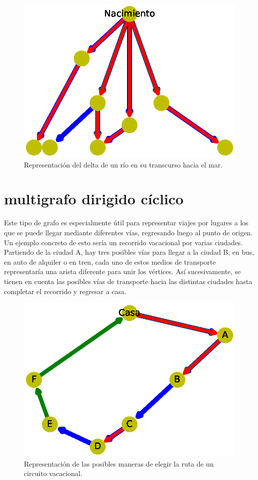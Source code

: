 \documentclass{article}
\begin{document}

\begin{figure}
  \includegraphics[width=.8\columnwidth]{10.eps}
  \caption{Representación del delta de un río en su transcurso hacia el mar.}
  \label{fig:10}
\end{figure}

\section{multigrafo dirigido cíclico}

Este tipo de grafo es especialmente útil para representar viajes por lugares a los que se puede llegar mediante diferentes vías, regresando luego al punto de origen. Un ejemplo concreto de esto sería un recorrido vacacional por varias ciudades. Partiendo de la ciudad A, hay tres posibles vías  para llegar a la ciudad B, en bus, en auto de alquiler o en tren, cada uno de estos medios de transporte representaría una arista diferente para unir los vértices. Así sucesivamente, se tienen en cuenta las posibles vías de transporte hacia las distintas ciudades hasta completar el recorrido y regresar a casa. 



\begin{figure}
  \includegraphics[width=.8\columnwidth]{11.eps}
  \caption{Representación de las posibles maneras de elegir la ruta de un circuito vacacional.}
  \label{fig:11}
\end{figure}
\end{document}
